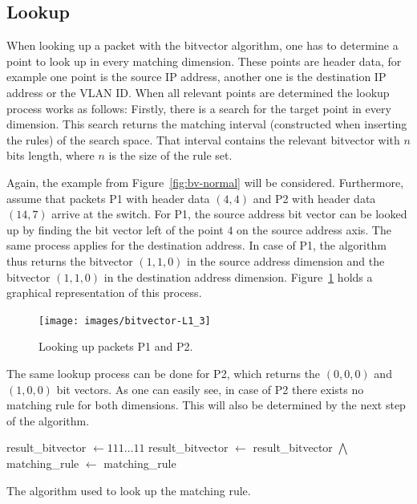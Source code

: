 \documentclass[a4paper,
		12pt,
		parskip=full,
		titlepage
		]{scrartcl}
\begin{document}
\subsection{Lookup}
When looking up a packet with the bitvector algorithm, one has to determine a point to look up in every matching dimension.
These points are header data, for example one point is the source IP address, another one is the destination IP address or the VLAN ID.
When all relevant points are determined the lookup process works as follows:
Firstly, there is a search for the target point in every dimension.
This search returns the matching interval (constructed when inserting the rules) of the search space.
That interval contains the relevant bitvector with $n$ bits length, where $n$ is the size of the rule set.

Again, the example from Figure~\ref{fig:bv-normal} will be considered.
Furthermore, assume that packets P1 with header data $(4, 4)$ and P2 with header data $(14, 7)$ arrive at the switch.
For P1, the source address bit vector can be looked up by finding the bit vector left of the point $4$ on the source address axis.
The same process applies for the destination address.
In case of P1, the algorithm thus returns the bitvector $(1, 1, 0)$ in the 
source address dimension and the bitvector $(1, 1, 0)$ in the destination address dimension.
Figure~\ref{fig:bv-lookup} holds a graphical representation of this process.

\begin{figure}
\centering
\texttt{[image: images/bitvector-L1\_3]}
\caption{Looking up packets P1 and P2.}
\label{fig:bv-lookup}
\end{figure}

The same lookup process can be done for P2, which returns the $(0, 0, 0)$ and $(1, 0, 0)$ bit vectors.
As one can easily see, in case of P2 there exists no matching rule for both dimensions.
This will also be determined by the next step of the algorithm.

\begin{algorithm}
\begin{algorithmic}[1]
    \State result\_bitvector $\gets 111\ldots 11$
        \State result\_bitvector $\gets$ result\_bitvector $\bigwedge$ 
    \EndFor
    \State matching\_rule $\gets$ 
    \State \Return matching\_rule
\EndFunction
\end{algorithmic}
\caption{The algorithm used to look up the matching rule.}
\label{alg:bv-join}
\end{algorithm}
\end{document}
